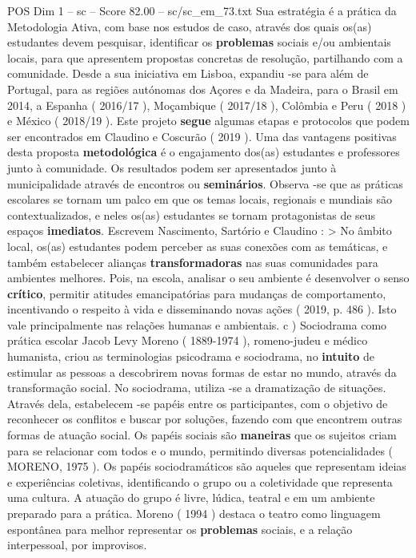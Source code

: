\begin{textsample}{POS Dim 1 – sc – Score 82.00 – sc/sc\_em\_73.txt}
Sua estratégia é a prática da Metodologia Ativa, com base nos estudos de caso, através dos quais os(as) estudantes devem pesquisar, identificar os \textbf{problemas} sociais e/ou ambientais locais, para que apresentem propostas concretas de resolução, partilhando com a comunidade.
Desde a sua iniciativa em Lisboa, expandiu -se para além de Portugal, para as regiões autónomas dos Açores e da Madeira, para o Brasil em 2014, a Espanha ( 2016/17 ), Moçambique ( 2017/18 ), Colômbia e Peru ( 2018 ) e México ( 2018/19 ).
Este projeto \textbf{segue} algumas etapas e protocolos que podem ser encontrados em Claudino e Coscurão ( 2019 ).
Uma das vantagens positivas desta proposta \textbf{metodológica} é o engajamento dos(as) estudantes e professores junto à comunidade.
Os resultados podem ser apresentados junto à municipalidade através de encontros ou \textbf{seminários}.
Observa -se que as práticas escolares se tornam um palco em que os temas locais, regionais e mundiais são contextualizados, e neles os(as) estudantes se tornam protagonistas de seus espaços \textbf{imediatos}.
Escrevem Nascimento, Sartório e Claudino : > No âmbito local, os(as) estudantes podem perceber as suas conexões com as temáticas, e também estabelecer alianças \textbf{transformadoras} nas suas comunidades para ambientes melhores.
Pois, na escola, analisar o seu ambiente é desenvolver o senso \textbf{crítico}, permitir atitudes emancipatórias para mudanças de comportamento, incentivando o respeito à vida e disseminando novas ações ( 2019, p. 486 ).
Isto vale principalmente nas relações humanas e ambientais. c ) Sociodrama como prática escolar Jacob Levy Moreno ( 1889-1974 ), romeno-judeu e médico humanista, criou as terminologias psicodrama e sociodrama, no \textbf{intuito} de estimular as pessoas a descobrirem novas formas de estar no mundo, através da transformação social.
No sociodrama, utiliza -se a dramatização de situações.
Através dela, estabelecem -se papéis entre os participantes, com o objetivo de reconhecer os conflitos e buscar por soluções, fazendo com que encontrem outras formas de atuação social.
Os papéis sociais são \textbf{maneiras} que os sujeitos criam para se relacionar com todos e o mundo, permitindo diversas potencialidades ( MORENO, 1975 ).
Os papéis sociodramáticos são aqueles que representam ideias e experiências coletivas, identificando o grupo ou a coletividade que representa uma cultura.
A atuação do grupo é livre, lúdica, teatral e em um ambiente preparado para a prática.
Moreno ( 1994 ) destaca o teatro como linguagem espontânea para melhor representar os \textbf{problemas} sociais, e a relação interpessoal, por improvisos.

\end{textsample}
